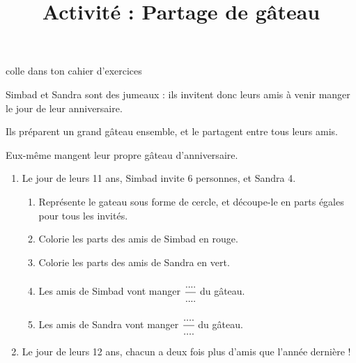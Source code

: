 \documentclass[a4paper,11pt]{article}
\title{Activité : Partage de gâteau}
\date{}
\author{}
\makeatletter
\renewcommand{\maketitle}{%
{\scriptsize colle dans ton cahier d'exercices}
	\begin{center}
		\LARGE
		\myuline{\@title}
		\vspace{0.5em}
	\end{center}
}
\makeatother
\begin{document}
\maketitle

\begin{enonce}
	Simbad et Sandra sont des jumeaux : ils invitent donc leurs amis à venir manger le jour de leur anniversaire.

	Ils préparent un grand gâteau ensemble, et le partagent entre tous leurs amis.

	Eux-même mangent leur propre gâteau d'anniversaire.
\end{enonce}

\begin{enumerate}
	\item Le jour de leurs 11 ans, Simbad invite 6 personnes, et Sandra 4.
	      \begin{enumerate}
		      \item Représente le gateau sous forme de cercle, et découpe-le en parts égales pour tous les invités.
		      \item Colorie les parts des amis de Simbad en rouge.
		      \item Colorie les parts des amis de Sandra en vert.
		      \item Les amis de Simbad vont manger $\cfrac{....}{....}$ du gâteau. \vspace{0.5em}
		      \item Les amis de Sandra vont manger $\cfrac{....}{....}$ du gâteau. \vspace{0.5em}
	      \end{enumerate}
	\item Le jour de leurs 12 ans, chacun a deux fois plus d'amis que l'année dernière !


\end{enumerate}
\end{document}
